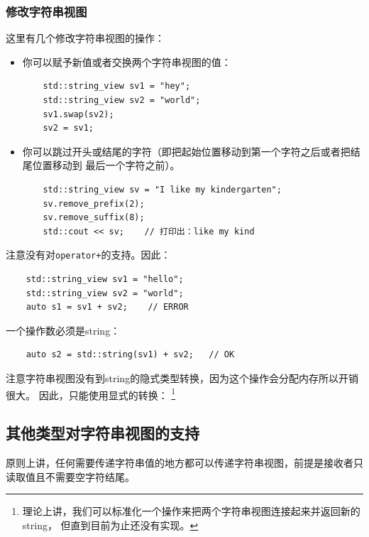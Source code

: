 \subsubsection{修改字符串视图}
这里有几个修改字符串视图的操作：
\begin{itemize}
    \item 你可以赋予新值或者交换两个字符串视图的值：
    \begin{lstlisting}
    std::string_view sv1 = "hey";
    std::string_view sv2 = "world";
    sv1.swap(sv2);
    sv2 = sv1;
    \end{lstlisting}
    \item 你可以跳过开头或结尾的字符（即把起始位置移动到第一个字符之后或者把结尾位置移动到
    最后一个字符之前）。
    \begin{lstlisting}
    std::string_view sv = "I like my kindergarten";
    sv.remove_prefix(2);
    sv.remove_suffix(8);
    std::cout << sv;    // 打印出：like my kind
    \end{lstlisting}
\end{itemize}
注意没有对\texttt{operator+}的支持。因此：
\begin{lstlisting}
    std::string_view sv1 = "hello";
    std::string_view sv2 = "world";
    auto s1 = sv1 + sv2;    // ERROR
\end{lstlisting}
一个操作数必须是string：
\begin{lstlisting}
    auto s2 = std::string(sv1) + sv2;   // OK
\end{lstlisting}
注意字符串视图没有到string的隐式类型转换，因为这个操作会分配内存所以开销很大。
因此，只能使用显式的转换：
\footnote{理论上讲，我们可以标准化一个操作来把两个字符串视图连接起来并返回新的string，
但直到目前为止还没有实现。}

\subsection{其他类型对字符串视图的支持}
原则上讲，任何需要传递字符串值的地方都可以传递字符串视图，前提是接收者只读取值且不需要空字符结尾。

